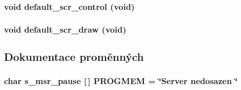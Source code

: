 \subsubsection[{default\_\-scr\_\-control}]{\setlength{\rightskip}{0pt plus 5cm}void default\_\-scr\_\-control (void)}\label{default__scr_8c_a959dd0c7a626e32bb9328e93fee4278d}
\subsubsection[{default\_\-scr\_\-draw}]{\setlength{\rightskip}{0pt plus 5cm}void default\_\-scr\_\-draw (void)}\label{default__scr_8c_a92943a1d6c25c652c6fcc1ba8b60861a}


\subsection{Dokumentace proměnných}
\subsubsection[{PROGMEM}]{\setlength{\rightskip}{0pt plus 5cm}char s\_\-msr\_\-pause [$\,$] {\bf PROGMEM} = \char`\"{}Server nedosazen \char`\"{}\hspace{0.3cm}{\ttfamily  [static]}}\label{default__scr_8c_ac595d68c2f45e2f775e81156c2d42850}
